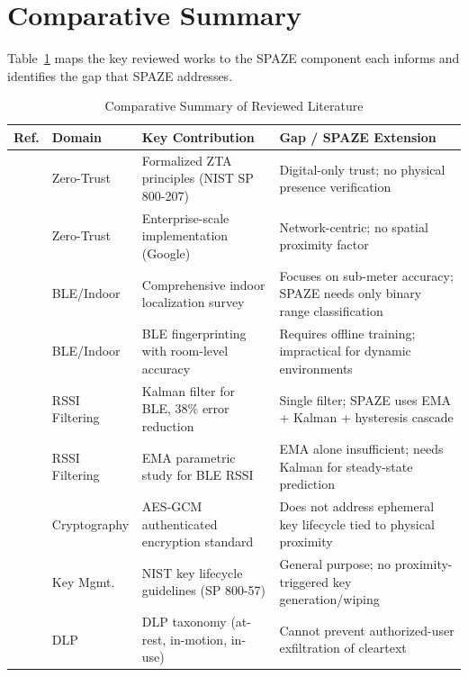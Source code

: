 \documentclass[conference]{IEEEtran}
\begin{document}
\section{Comparative Summary}
\label{sec:comparison}

Table~\ref{tab:comparison} maps the key reviewed works to the SPAZE component each informs and identifies the gap that SPAZE addresses.

\begin{table}[htbp]
    \centering
    \caption{Comparative Summary of Reviewed Literature}
    \label{tab:comparison}
    \begin{tabularx}{\textwidth}{l l X X}
        \toprule
        \textbf{Ref.} & \textbf{Domain} & \textbf{Key Contribution} & \textbf{Gap / SPAZE Extension} \\
        \midrule
        \cite{nist_zerotrust} & Zero-Trust & Formalized ZTA principles (NIST SP 800-207) & Digital-only trust; no physical presence verification \\
        \cite{beyondcorp} & Zero-Trust & Enterprise-scale implementation (Google) & Network-centric; no spatial proximity factor \\
        \cite{zafari2019} & BLE/Indoor & Comprehensive indoor localization survey & Focuses on sub-meter accuracy; SPAZE needs only binary range classification \\
        \cite{faragher2015} & BLE/Indoor & BLE fingerprinting with room-level accuracy & Requires offline training; impractical for dynamic environments \\
        \cite{liu2019kalman} & RSSI Filtering & Kalman filter for BLE, 38\% error reduction & Single filter; SPAZE uses EMA + Kalman + hysteresis cascade \\
        \cite{bulten2016} & RSSI Filtering & EMA parametric study for BLE RSSI & EMA alone insufficient; needs Kalman for steady-state prediction \\
        \cite{aes_gcm_nist} & Cryptography & AES-GCM authenticated encryption standard & Does not address ephemeral key lifecycle tied to physical proximity \\
        \cite{barker2020} & Key Mgmt. & NIST key lifecycle guidelines (SP 800-57) & General purpose; no proximity-triggered key generation/wiping \\
        \cite{shabtai2012} & DLP & DLP taxonomy (at-rest, in-motion, in-use) & Cannot prevent authorized-user exfiltration of cleartext \\

\end{tabularx}
\end{table}
\end{document}
